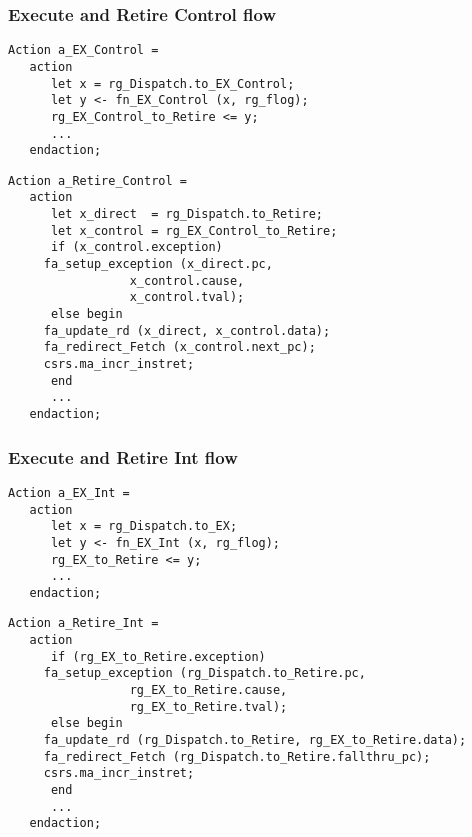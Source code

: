 
\begin{frame}[fragile]
\frametitle{Execute and Retire Control flow}

\footnotesize

\begin{minipage}{0.725\textwidth}
\begin{Verbatim}[frame=single, label=From src\_Drum/CPU.bsv]
   Action a_EX_Control =
   action
      let x = rg_Dispatch.to_EX_Control;
      let y <- fn_EX_Control (x, rg_flog);
      rg_EX_Control_to_Retire <= y;
      ...
   endaction;
\end{Verbatim}
\end{minipage}

\begin{minipage}{0.725\textwidth}
\begin{Verbatim}[frame=single]
   Action a_Retire_Control =
   action
      let x_direct  = rg_Dispatch.to_Retire;
      let x_control = rg_EX_Control_to_Retire;
      if (x_control.exception)
	 fa_setup_exception (x_direct.pc,
			     x_control.cause,
			     x_control.tval);
      else begin
	 fa_update_rd (x_direct, x_control.data);
	 fa_redirect_Fetch (x_control.next_pc);
	 csrs.ma_incr_instret;
      end
      ...
   endaction;
\end{Verbatim}
\end{minipage}

\end{frame}


\begin{frame}[fragile]
\frametitle{Execute and Retire Int flow}

\footnotesize

\begin{minipage}{0.725\textwidth}
\begin{Verbatim}[frame=single, label=From src\_Drum/CPU.bsv]
   Action a_EX_Int =
   action
      let x = rg_Dispatch.to_EX;
      let y <- fn_EX_Int (x, rg_flog);
      rg_EX_to_Retire <= y;
      ...
   endaction;
\end{Verbatim}
\end{minipage}

\begin{minipage}{0.725\textwidth}
\begin{Verbatim}[frame=single]
   Action a_Retire_Int =
   action
      if (rg_EX_to_Retire.exception)
	 fa_setup_exception (rg_Dispatch.to_Retire.pc,
			     rg_EX_to_Retire.cause,
			     rg_EX_to_Retire.tval);
      else begin
	 fa_update_rd (rg_Dispatch.to_Retire, rg_EX_to_Retire.data);
	 fa_redirect_Fetch (rg_Dispatch.to_Retire.fallthru_pc);
	 csrs.ma_incr_instret;
      end
      ...
   endaction;
\end{Verbatim}
\end{minipage}

\end{frame}

